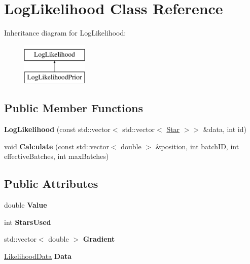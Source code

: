 \hypertarget{classLogLikelihood}{}\section{Log\+Likelihood Class Reference}
\label{classLogLikelihood}
Inheritance diagram for Log\+Likelihood\+:\begin{figure}[H]
\begin{center}
\leavevmode
\includegraphics[height=2.000000cm]{classLogLikelihood}
\end{center}
\end{figure}
\subsection*{Public Member Functions}
\begin{DoxyCompactItemize}
\item 
\mbox{\label{classLogLikelihood_a677cb07d3097385392fe49944e522858}} 
{\bfseries Log\+Likelihood} (const std\+::vector$<$ std\+::vector$<$ \hyperlink{classStar}{Star} $>$$>$ \&data, int id)
\item 
\mbox{\label{classLogLikelihood_a748d75e2eb89965246436eb6a9274004}} 
void {\bfseries Calculate} (const std\+::vector$<$ double $>$ \&position, int batch\+ID, int effective\+Batches, int max\+Batches)
\end{DoxyCompactItemize}
\subsection*{Public Attributes}
\begin{DoxyCompactItemize}
\item 
\mbox{\label{classLogLikelihood_a97ff9863958ffb93e74da07721a30cc6}} 
double {\bfseries Value}
\item 
\mbox{\label{classLogLikelihood_a3a4e3a1d76a663bca3705b471af583cc}} 
int {\bfseries Stars\+Used}
\item 
\mbox{\label{classLogLikelihood_af6d93b053cfdc1966318018831a849ec}} 
std\+::vector$<$ double $>$ {\bfseries Gradient}
\item 
\mbox{\label{classLogLikelihood_ae89760ae57fa9e0ce5ef01c2b35cf487}} 
\hyperlink{classLikelihoodData}{Likelihood\+Data} {\bfseries Data}
\end{DoxyCompactItemize}
